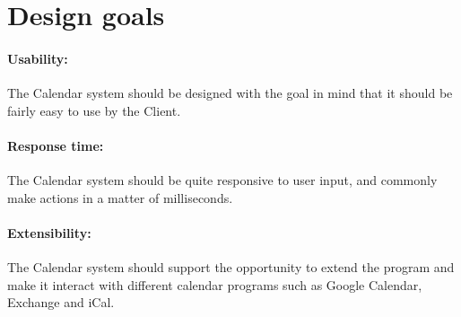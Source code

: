\section{Design goals}

\paragraph{Usability: } The Calendar system should be designed with the goal in mind that it should be fairly easy to use by the Client. 

\paragraph{Response time: } The Calendar system should be quite responsive to user input, and commonly make actions in a matter of milliseconds. 

\paragraph{Extensibility: } The Calendar system should support the opportunity to extend the program and make it interact with different calendar programs such as Google Calendar, Exchange and iCal. 